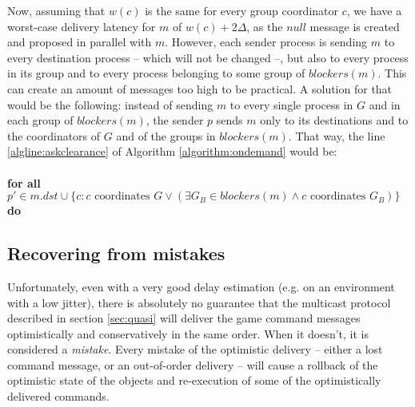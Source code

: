 \documentclass[times, 10pt]{article}
\begin{document}
Now, assuming that $w(c)$ is the same for every group coordinator $c$, we have a worst-case delivery latency for $m$ of $w(c) + 2\Delta$, as the $null$ message is created and proposed in parallel with $m$. However, each sender process is sending $m$ to every destination process -- which will not be changed --, but also to every process in its group and to every process belonging to some group of $blockers(m)$. This can create an amount of messages too high to be practical. A solution for that would be the following: instead of sending $m$ to every single process in $G$ and in each group of $blockers(m)$, the sender $p$ sends $m$ only to its destinations and to the coordinators of $G$ and of the groups in $blockers(m)$. That way, the line \ref{algline:askclearance} of Algorithm \ref{algorithm:ondemand} would be:
\\
\\
\textbf{for all}\\$p' \in m.dst \cup \{c : c\text{ coordinates }G \vee (\exists G_B \in blockers(m) \wedge c\text{ coordinates }G_B)\}$\\\textbf{do}



\subsection{Recovering from mistakes}

Unfortunately, even with a very good delay estimation (e.g. on an environment with a low jitter), there is absolutely no guarantee that the multicast protocol described  in section \ref{sec:quasi} will deliver the game command messages optimistically and conservatively in the same order. When it doesn't, it is considered a \emph{mistake}. Every mistake of the optimistic delivery -- either a lost command message, or an out-of-order delivery -- will cause a rollback of the optimistic state of the objects and re-execution of some of the optimistically delivered commands.
\end{document}
